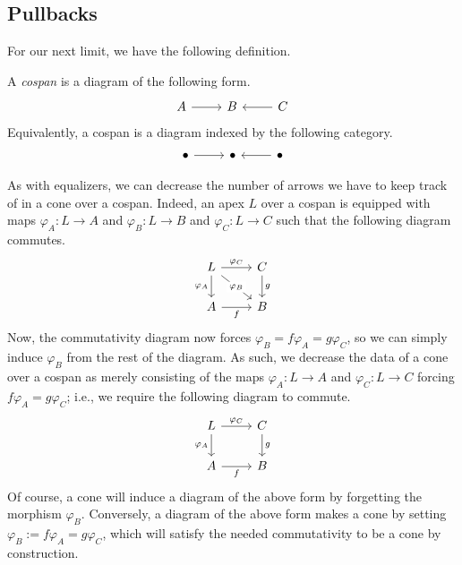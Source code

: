 \documentclass[../notes.tex]{subfiles}
\begin{document}
\subsection{Pullbacks}
For our next limit, we have the following definition.
\begin{definition}[Cospan]
	A \textit{cospan} is a diagram of the following form.
	\[\begin{tikzcd}
		A & B & C
		\arrow[from=1-1, to=1-2]
		\arrow[from=1-3, to=1-2]
	\end{tikzcd}\]
	Equivalently, a cospan is a diagram indexed by the following category.
	\[\begin{tikzcd}
		\bullet & \bullet & \bullet
		\arrow[from=1-1, to=1-2]
		\arrow[from=1-3, to=1-2]
	\end{tikzcd}\]
\end{definition}
As with equalizers, we can decrease the number of arrows we have to keep track of in a cone over a cospan. Indeed, an apex $L$ over a cospan is equipped with maps $\varphi_A:L\to A$ and $\varphi_B:L\to B$ and $\varphi_C:L\to C$ such that the following diagram commutes.
\[\begin{tikzcd}
	L & C \\
	A & B
	\arrow["g", from=1-2, to=2-2]
	\arrow["f"', from=2-1, to=2-2]
	\arrow["{\varphi_C}", from=1-1, to=1-2]
	\arrow["{\varphi_A}"', from=1-1, to=2-1]
	\arrow["{\varphi_B}"{description}, from=1-1, to=2-2]
\end{tikzcd}\]
Now, the commutativity diagram now forces $\varphi_B=f\varphi_A=g\varphi_C$, so we can simply induce $\varphi_B$ from the rest of the diagram. As such, we decrease the data of a cone over a cospan as merely consisting of the maps $\varphi_A:L\to A$ and $\varphi_C:L\to C$ forcing $f\varphi_A=g\varphi_C$; i.e., we require the following diagram to commute.
\[\begin{tikzcd}
	L & C \\
	A & B
	\arrow["g", from=1-2, to=2-2]
	\arrow["f"', from=2-1, to=2-2]
	\arrow["{\varphi_C}", from=1-1, to=1-2]
	\arrow["{\varphi_A}"', from=1-1, to=2-1]
\end{tikzcd}\]
Of course, a cone will induce a diagram of the above form by forgetting the morphism $\varphi_B$. Conversely, a diagram of the above form makes a cone by setting $\varphi_B:=f\varphi_A=g\varphi_C$, which will satisfy the needed commutativity to be a cone by construction.
\end{document}
